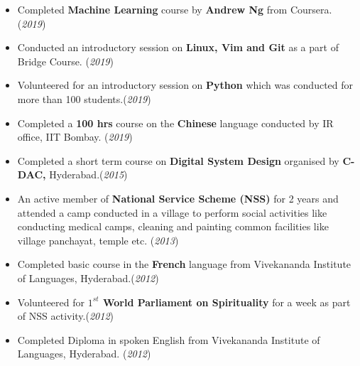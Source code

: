 \documentclass[10pt]{article}
\begin{document}
\colorbox{bl}{}
\vspace{-0.5cm}
\begin{itemize}[leftmargin=0.4cm]
	\item {Completed \textbf{Machine Learning} course by \textbf{Andrew Ng} from Coursera. }\hfill{(\textit{2019})}\vspace{-0.25cm}
	\item {Conducted an introductory session on \textbf{Linux, Vim and Git} as a part of Bridge Course. }\hfill{(\textit{2019})}\vspace{-0.25cm}
	\item {Volunteered for an introductory session on \textbf{Python} which was conducted for more than 100 students.}\hfill{(\textit{2019})}\vspace{-0.25cm}
    \item {Completed a \textbf{100 hrs} course on the \textbf{Chinese} language conducted by IR office, IIT Bombay. }\hfill{(\textit{2019})}\vspace{-0.25cm}
    \item {Completed a short term course on \textbf{Digital System Design} organised by \textbf{C-DAC,} Hyderabad.}\hfill{(\textit{2015})}\vspace{-0.25cm}
	\item {An active member of \textbf{National Service Scheme (NSS)} for 2 years and attended a camp conducted in a village to perform social activities like conducting medical camps, cleaning and painting common facilities like village panchayat, temple etc.} \hfill{(\textit{2013})}\vspace{-0.25cm}
    \item {Completed basic course in the \textbf{French} language from Vivekananda Institute of Languages, Hyderabad.}\hfill{(\textit{2012})}\vspace{-0.25cm}
   	\item {Volunteered for \textbf{$1^{st}$ World Parliament on Spirituality} for a week as part of NSS activity.}\hfill{(\textit{2012})}\vspace{-0.25cm}
	\item {Completed Diploma in spoken English from Vivekananda Institute of Languages, Hyderabad.} \hfill{(\textit{2012})}\vspace{-0.2cm}
   
\end{itemize}

\end{document}
